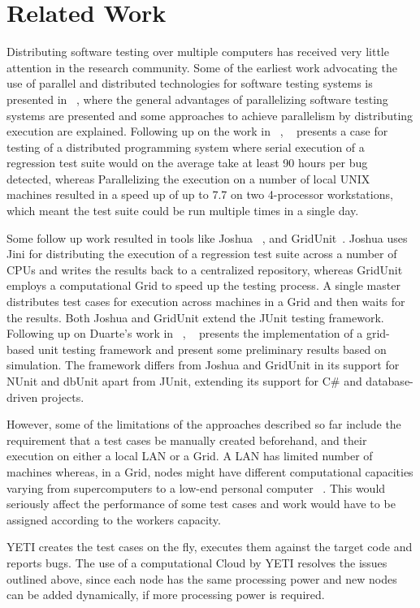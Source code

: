 \section{Related Work}
Distributing software testing over multiple computers has received very little attention in the research community. 
Some of the earliest work advocating the use of parallel and distributed technologies for software testing systems 
is presented in ~\cite{stark}, where the general advantages of parallelizing software testing systems are presented and some
approaches to achieve parallelism by distributing execution are explained. Following up on the work in ~\cite{stark}, 
~\cite{lasto} presents a case for testing of a distributed programming system where serial execution of a regression test 
suite would on the average take at least 90 hours per bug detected, whereas Parallelizing the execution on a number of local 
UNIX machines resulted in a speed up of up to 7.7 on two 4-processor workstations, which meant the test suite could be run multiple 
times in a single day.

Some follow up work resulted in tools like Joshua ~\cite{Kap}, and GridUnit~\cite{Duarte1, Duarte2, Duarte3}. 
Joshua uses Jini for distributing the execution of a regression test suite across a number of CPUs and 
writes the results back to a centralized repository, whereas GridUnit employs a computational Grid to speed up the testing process. 
A single master distributes test cases for execution across machines in a Grid and then waits for the results.
Both Joshua and GridUnit extend the JUnit testing framework. Following up on Duarte's work in ~\cite{Duarte3}, ~\cite{yao} presents 
the implementation of a grid-based unit testing framework and present some preliminary results based on simulation. 
The framework  differs from Joshua and GridUnit in its support for NUnit and dbUnit apart from JUnit, extending its support for C\# and database-driven projects.

However, some of the limitations of the approaches described so far include the requirement that a test cases be manually created beforehand, 
and their execution on either a local LAN or a Grid. A LAN has limited number of machines whereas, in a Grid, nodes might have different 
computational capacities varying from supercomputers to a low-end personal computer ~\cite{yao}. This would seriously affect the performance 
of some test cases and work would have to be assigned according to the workers capacity. 


YETI creates the test cases on the fly, executes them against the target code and reports bugs. The use of a computational Cloud by YETI resolves the issues 
outlined above, since each node has the same processing power and new nodes can be added dynamically, if more processing power is required. 



